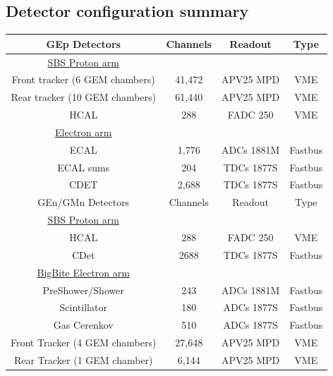 \documentclass{article}
\begin{document}
 


\subsection{Detector configuration summary}
\begin{tabular}{|c|c|c|c|}
\hline
GEp Detectors & Channels& Readout & Type \\
\hline
\underline{SBS Proton arm} & & & \\
Front tracker (6 GEM chambers) & 41,472 & APV25 MPD& VME\\
Rear tracker (10 GEM chambers) & 61,440& APV25 MPD& VME\\
HCAL & 288 & FADC 250 &VME\\
\hline
\underline{Electron arm} & & & \\
ECAL & 1,776 & ADCs 1881M &Fastbus\\
ECAL sums& 204 & TDCs 1877S &Fastbus\\
CDET & 2,688 & TDCs 1877S &Fastbus \\
\hline
\hline
GEn/GMn Detectors & Channels& Readout & Type \\
\hline
\underline{SBS Proton arm} & & & \\
HCAL & 288 & FADC 250 &VME\\
CDet & 2688 & TDCs 1877S&Fastbus\\
\hline
\underline{BigBite Electron arm} & & & \\
PreShower/Shower & 243 & ADCs 1881M&Fastbus\\
Scintillator & 180& ADCs 1877S&Fastbus\\
Gas Cerenkov & 510& ADCs 1877S&Fastbus\\
Front Tracker (4 GEM chambers) & 27,648 & APV25 MPD &VME\\
Rear Tracker (1 GEM chamber) & 6,144& APV25 MPD &VME\\
\hline
\end{tabular}
\end{document}
